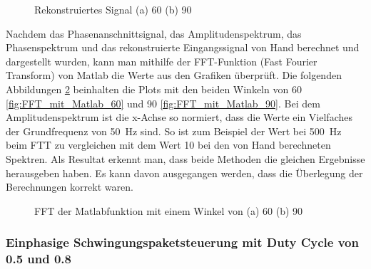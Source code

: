 \begin{figure}[h]
	\centering
	\qquad
	\caption{Rekonstruiertes Signal (a) 60\textdegree \hspace{0.02cm} (b) 90\textdegree}
	\label{fig:Rekonstruiertes Signal}
\end{figure} 


Nachdem das Phasenanschnittsignal, das Amplitudenspektrum, das Phasenspektrum und das rekonstruierte Eingangssignal von Hand berechnet und dargestellt wurden, kann man mithilfe der FFT-Funktion (Fast Fourier Transform) von Matlab die Werte aus den Grafiken überprüft. Die folgenden Abbildungen \ref{fig:FFT_mit_Matlab} beinhalten die Plots mit den beiden Winkeln von 60\textdegree \hspace{0.02cm} \ref{fig:FFT_mit_Matlab_60} und 90\textdegree \hspace{0.02cm} \ref{fig:FFT_mit_Matlab_90}. Bei dem Amplitudenspektrum ist die x-Achse so normiert, dass die Werte ein Vielfaches der Grundfrequenz von \SI{50}{Hz} sind. So ist zum Beispiel der Wert bei \SI{500}{Hz} beim FTT zu vergleichen mit dem Wert 10 bei den von Hand berechneten Spektren. Als Resultat erkennt man, dass beide Methoden die gleichen Ergebnisse herausgeben haben. Es kann davon ausgegangen werden, dass die Überlegung der Berechnungen korrekt waren.

\begin{figure}[h]
	\centering
	\qquad
	\caption{FFT der Matlabfunktion mit einem Winkel von (a) 60\textdegree \hspace{0.02cm} (b) 90\textdegree}
	\label{fig:FFT_mit_Matlab}
\end{figure}

\newpage

\subsubsection{Einphasige Schwingungspaketsteuerung mit Duty Cycle von 0.5 und 0.8}

